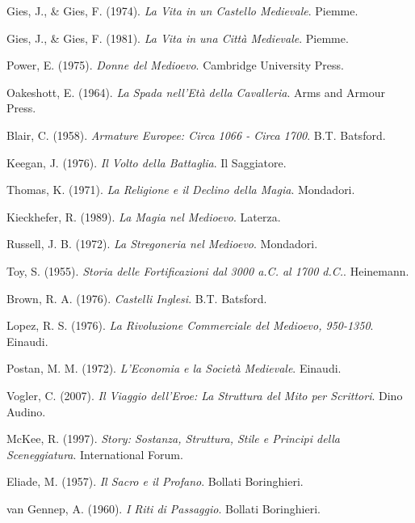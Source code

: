 Gies, J., \& Gies, F. (1974).
\textit{La Vita in un Castello Medievale}.
Piemme.

Gies, J., \& Gies, F. (1981).
\textit{La Vita in una Città Medievale}.
Piemme.

Power, E. (1975).
\textit{Donne del Medioevo}.
Cambridge University Press.

Oakeshott, E. (1964).
\textit{La Spada nell'Età della Cavalleria}.
Arms and Armour Press.

Blair, C. (1958).
\textit{Armature Europee: Circa 1066 - Circa 1700}.
B.T. Batsford.

Keegan, J. (1976).
\textit{Il Volto della Battaglia}.
Il Saggiatore.

Thomas, K. (1971).
\textit{La Religione e il Declino della Magia}.
Mondadori.

Kieckhefer, R. (1989).
\textit{La Magia nel Medioevo}.
Laterza.

Russell, J. B. (1972).
\textit{La Stregoneria nel Medioevo}.
Mondadori.

Toy, S. (1955).
\textit{Storia delle Fortificazioni dal 3000 a.C. al 1700 d.C.}.
Heinemann.

Brown, R. A. (1976).
\textit{Castelli Inglesi}.
B.T. Batsford.

Lopez, R. S. (1976).
\textit{La Rivoluzione Commerciale del Medioevo, 950-1350}.
Einaudi.

Postan, M. M. (1972).
\textit{L'Economia e la Società Medievale}.
Einaudi.

Vogler, C. (2007).
\textit{Il Viaggio dell'Eroe: La Struttura del Mito per Scrittori}.
Dino Audino.

McKee, R. (1997).
\textit{Story: Sostanza, Struttura, Stile e Principi della Sceneggiatura}.
International Forum.

Eliade, M. (1957).
\textit{Il Sacro e il Profano}.
Bollati Boringhieri.

van Gennep, A. (1960).
\textit{I Riti di Passaggio}.
Bollati Boringhieri.


